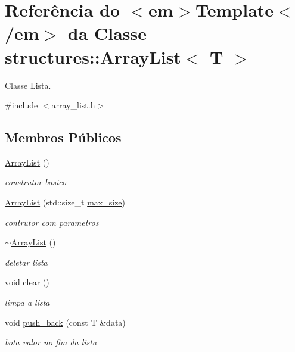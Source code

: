\hypertarget{classstructures_1_1ArrayList}{}\section{Referência do $<$em$>$Template$<$/em$>$ da Classe structures\+::Array\+List$<$ T $>$}
\label{classstructures_1_1ArrayList}


Classe Lista.  




{\ttfamily \#include $<$array\+\_\+list.\+h$>$}

\subsection*{Membros Públicos}
\begin{DoxyCompactItemize}
\item 
\mbox{\hyperlink{classstructures_1_1ArrayList_a1fab93fc7adb5e4825f51dda6d4a0266}{Array\+List}} ()
\begin{DoxyCompactList}\small\item\em construtor basico \end{DoxyCompactList}\item 
\mbox{\hyperlink{classstructures_1_1ArrayList_adfdce2839f1d1197bb0fb9cc9e1ddd2a}{Array\+List}} (std\+::size\+\_\+t \mbox{\hyperlink{classstructures_1_1ArrayList_a8f0772886f296281ea03af9578f67969}{max\+\_\+size}})
\begin{DoxyCompactList}\small\item\em contrutor com parametros \end{DoxyCompactList}\item 
\mbox{\hyperlink{classstructures_1_1ArrayList_a7b4a27fb73c49bb495916b45f061133c}{$\sim$\+Array\+List}} ()
\begin{DoxyCompactList}\small\item\em deletar lista \end{DoxyCompactList}\item 
void \mbox{\hyperlink{classstructures_1_1ArrayList_afcef88bcb3924751be3c188bad43531b}{clear}} ()
\begin{DoxyCompactList}\small\item\em limpa a lista \end{DoxyCompactList}\item 
void \mbox{\hyperlink{classstructures_1_1ArrayList_a48f49e0fc24d787f1d484cd72581f4c6}{push\+\_\+back}} (const T \&data)
\begin{DoxyCompactList}\small\item\em bota valor no fim da lista \end{DoxyCompactList}\item 

\end{DoxyCompactItemize}
